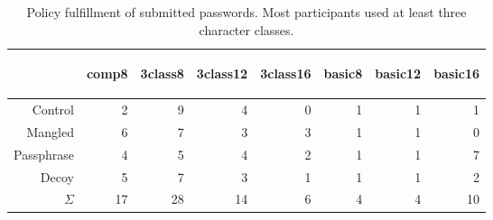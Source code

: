 \begin{table}
  \centering
  \caption{\label{tab:decoy:policies}Policy fulfillment of submitted passwords. Most participants used at least three character classes.}
    \begin{tabular}{rrrrrrrr}
    \toprule
          & \begin{turn}{45}comp8\end{turn} & \begin{turn}{45}3class8\end{turn} & \begin{turn}{45}3class12\end{turn} & \begin{turn}{45}3class16\end{turn} & \begin{turn}{45}basic8\end{turn} & \begin{turn}{45}basic12\end{turn} & \begin{turn}{45}basic16\end{turn} \\
    \midrule
    Control     & 2     & 9     & 4     & 0     & 1     & 1     & 1 \\
    Mangled    & 6     & 7     & 3     & 3     & 1     & 1     & 0 \\
   Passphrase   & 4     & 5     & 4     & 2     & 1     & 1     & 7 \\
    Decoy    & 5     & 7     & 3     & 1     & 1     & 1     & 2 \\
    \midrule
    $\Sigma$  & 17    & 28    & 14    & 6     & 4     & 4     & 10 \\
    \bottomrule
    \end{tabular}%
\end{table}%